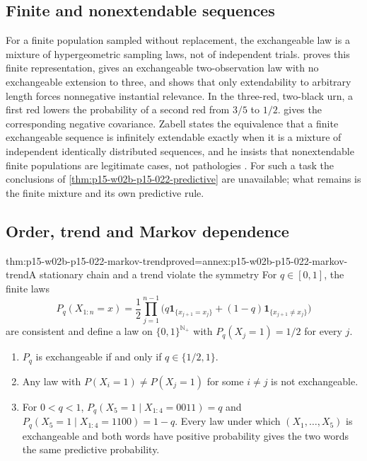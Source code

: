 \subsection{Finite and nonextendable sequences}

For a finite population sampled without replacement, the exchangeable law
is a mixture of hypergeometric sampling laws, not of independent trials.
 proves this finite representation,
gives an exchangeable two-observation law with no exchangeable extension to
three, and shows that only extendability to arbitrary length forces
nonnegative instantial relevance. In the three-red, two-black urn, a first
red lowers the probability of a second red from \(3/5\) to \(1/2\).
 gives the corresponding negative
covariance. Zabell states the equivalence that a finite exchangeable
sequence is infinitely extendable exactly when it is a mixture of
independent identically distributed sequences, and he insists that
nonextendable finite populations are legitimate cases, not pathologies
\cite[pp.~281--283]{Zabell2011CarnapInductiveInference}. For such a task the
conclusions of \cref{thm:p15-w02b-p15-022-predictive} are unavailable;
what remains is the finite mixture and its own predictive rule.

\subsection{Order, trend and Markov dependence}

\begin{hbtheorem}{thm:p15-w02b-p15-022-markov-trend}{proved=annex:p15-w02b-p15-022-markov-trend}{A stationary chain and a trend violate the symmetry}
For \(q\in[0,1]\), the finite laws
\[
 P_q(X_{1:n}=x)=\frac12\prod_{j=1}^{n-1}
   \bigl(q\mathbf1_{\{x_{j+1}=x_j\}}+(1-q)\mathbf1_{\{x_{j+1}\neq x_j\}}\bigr)
\]
are consistent and define a law on \(\{0,1\}^{\mathbb N_+}\) with
\(P_q(X_j=1)=1/2\) for every \(j\).
\begin{enumerate}
\item \(P_q\) is exchangeable if and only if \(q\in\{1/2,1\}\).
\item Any law with \(P(X_i=1)\neq P(X_j=1)\) for some \(i\neq j\) is not
      exchangeable.
\item For \(0<q<1\), \(P_q(X_5=1\mid X_{1:4}=0011)=q\) and
      \(P_q(X_5=1\mid X_{1:4}=1100)=1-q\). Every law under which
      \((X_1,\ldots,X_5)\) is exchangeable and both words have positive
      probability gives the two words the same predictive probability.
\end{enumerate}
\end{hbtheorem}


